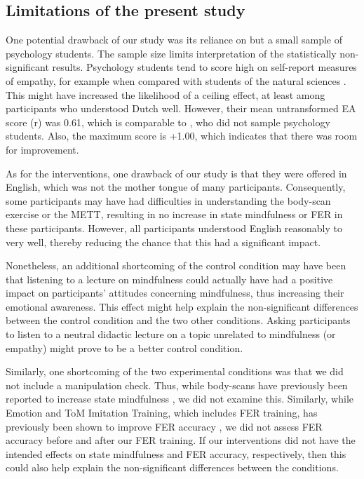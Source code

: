 \documentclass[authordate, empirical, issue]{jote-new-article}
\begin{document}
\subsection{Limitations of the present study}



One potential drawback of our study was its reliance on but a small sample of psychology students. The sample size limits interpretation of the statistically non-significant results. Psychology students tend to score high on self-report measures of empathy, for example when compared with students of the natural sciences \parencites{Thomson2015}. This might have increased the likelihood of a ceiling effect, at least among participants who understood Dutch well. However, their mean untransformed EA score (r) was 0.61, which is comparable to \textcite{Thiel2018}, who did not sample psychology students. Also, the maximum score is +1.00, which indicates that there was room for improvement.



As for the interventions, one drawback of our study is that they were offered in English, which was not the mother tongue of many participants. Consequently, some participants may have had difficulties in understanding the body-scan exercise or the METT, resulting in no increase in state mindfulness or FER in these participants. However, all participants understood English reasonably to very well, thereby reducing the chance that this had a significant impact.



Nonetheless, an additional shortcoming of the control condition may have been that listening to a lecture on mindfulness could actually have had a positive impact on participants' attitudes concerning mindfulness, thus increasing their emotional awareness. This effect might help explain the non-significant differences between the control condition and the two other conditions. Asking participants to listen to a neutral didactic lecture on a topic unrelated to mindfulness (or empathy) might prove to be a better control condition.



Similarly, one shortcoming of the two experimental conditions was that we did not include a manipulation check. Thus, while body-scans have previously been reported to increase state mindfulness \parencites{Upton2019}, we did not examine this. Similarly, while Emotion and ToM Imitation Training, which includes FER training, has previously been shown to improve FER accuracy \parencites{Mazza2010}, we did not assess FER accuracy before and after our FER training. If our interventions did not have the intended effects on state mindfulness and FER accuracy, respectively, then this could also help explain the non-significant differences between the conditions.
\end{document}

